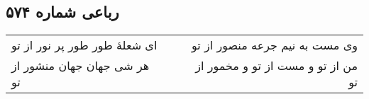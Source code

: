 \begin{center}
\section*{رباعی شماره ۵۷۴}
\label{sec:sh574}
\begin{longtable}{l p{0.5cm} r}
ای شعلهٔ طور طور پر نور از تو
&&
وی مست به نیم جرعه منصور از تو
\\
هر شی جهان جهان منشور از تو
&&
من از تو و مست از تو و مخمور از تو
\\
\end{longtable}
\end{center}
